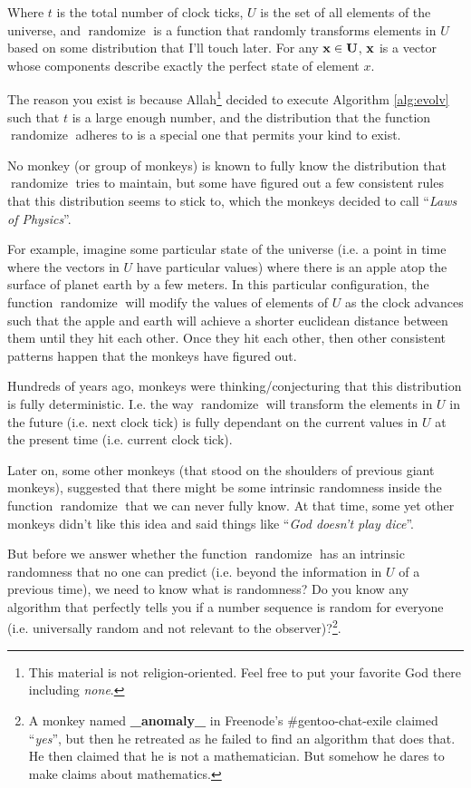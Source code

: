 \documentclass{report}
\DeclareMathOperator{\randomize}{randomize}
\begin{document}
Where $t$ is the total number of clock ticks, $U$ is the set of all elements of
the universe, and $\randomize$ is a function that randomly transforms elements
in $U$ based on some distribution that I'll touch later. For any $\bf{x} \in
U$, $\bf{x}$ is a vector whose components describe exactly the perfect state of
element $x$.

The reason you exist is because Allah\footnote{This material is not
religion-oriented. Feel free to put your favorite God there including
\emph{none}.} decided to execute Algorithm \ref{alg:evolv} such that $t$ is a
large enough number, and the distribution that the function $\randomize$
adheres to is a special one that permits your kind to exist.

No monkey (or group of monkeys) is known to fully know the distribution that
$\randomize$ tries to maintain, but some have figured out a few consistent
rules that this distribution seems to stick to, which the monkeys decided to
call ``\emph{Laws of Physics}''.

For example, imagine some particular state of the universe (i.e. a point in
time where the vectors in $U$ have particular values) where there is an apple
atop the surface of planet earth by a few meters. In this particular
configuration, the function $\randomize$ will modify the values of elements of
$U$ as the clock advances such that the apple and earth will achieve a shorter
euclidean distance between them until they hit each other. Once they hit each
other, then other consistent patterns happen that the monkeys have figured out.

Hundreds of years ago, monkeys were thinking/conjecturing that
this distribution is fully deterministic. I.e. the way $\randomize$ will
transform the elements in $U$ in the future (i.e. next clock tick) is fully
dependant on the current values in $U$ at the present time (i.e. current clock
tick).

Later on, some other monkeys (that stood on the shoulders of previous giant
monkeys), suggested that there might be some intrinsic randomness inside the
function $\randomize$ that we can never fully know. At that time, some yet
other monkeys didn't like this idea and said things like ``\emph{God doesn't
play dice}''.

But before we answer whether the function $\randomize$ has an intrinsic
randomness that no one can predict (i.e. beyond the information in $U$ of a
previous time), we need to know what is randomness? Do you know any algorithm
that perfectly tells you if a number sequence is random for everyone (i.e.
universally random and not relevant to the observer)?\footnote{A monkey named
\textbf{\_anomaly\_} in Freenode's \#gentoo-chat-exile claimed ``\emph{yes}'',
but then he retreated as he failed to find an algorithm that does that. He then
claimed that he is not a mathematician. But somehow he dares to make claims
about mathematics.}.
\end{document}
